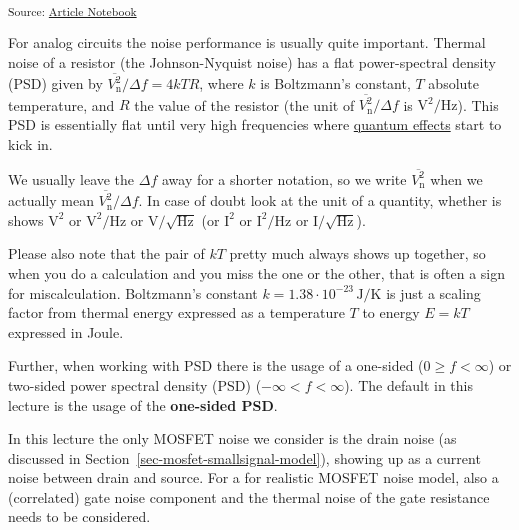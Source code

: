 \documentclass[
  a4paper,
  DIV=11,
  numbers=noendperiod]{scrartcl}
\begin{document}
\textsubscript{Source:
\href{https://iic-jku.github.io/analog-circuit-design/index.qmd.html}{Article
Notebook}}

For analog circuits the noise performance is usually quite important.
Thermal noise of a resistor (the Johnson-Nyquist noise) has a flat
power-spectral density (PSD) given by
\(\overline{V_\mathrm{n}^2}/\Delta f = 4 k T R\), where \(k\) is
Boltzmann's constant, \(T\) absolute temperature, and \(R\) the value of
the resistor (the unit of \(\overline{V_\mathrm{n}^2}/\Delta f\) is
\(\text{V}^2/\text{Hz}\)). This PSD is essentially flat until very high
frequencies where
\href{https://en.wikipedia.org/wiki/Johnson–Nyquist_noise}{quantum
effects} start to kick in.

\begin{tcolorbox}[enhanced jigsaw, breakable, title=\textcolor{quarto-callout-note-color}{\faInfo}\hspace{0.5em}{Noise Notation}, left=2mm, bottomrule=.15mm, opacitybacktitle=0.6, opacityback=0, colframe=quarto-callout-note-color-frame, leftrule=.75mm, bottomtitle=1mm, colbacktitle=quarto-callout-note-color!10!white, toprule=.15mm, rightrule=.15mm, toptitle=1mm, titlerule=0mm, arc=.35mm, colback=white, coltitle=black]

We usually leave the \(\Delta f\) away for a shorter notation, so we
write \(\overline{V_\mathrm{n}^2}\) when we actually mean
\(\overline{V_\mathrm{n}^2}/\Delta f\). In case of doubt look at the
unit of a quantity, whether is shows \(\text{V}^2\) or
\(\text{V}^2/\text{Hz}\) or \(\text{V}/\sqrt{\text{Hz}}\) (or
\(\text{I}^2\) or \(\text{I}^2/\text{Hz}\) or
\(\text{I}/\sqrt{\text{Hz}}\)).

Please also note that the pair of \(k T\) pretty much always shows up
together, so when you do a calculation and you miss the one or the
other, that is often a sign for miscalculation. Boltzmann's constant
\(k = 1.38 \cdot 10^{-23}\,\text{J/K}\) is just a scaling factor from
thermal energy expressed as a temperature \(T\) to energy \(E = k T\)
expressed in Joule.

Further, when working with PSD there is the usage of a one-sided
(\(0 \ge f < \infty\)) or two-sided power spectral density (PSD)
(\(-\infty < f < \infty\)). The default in this lecture is the usage of
the \textbf{one-sided PSD}.

\end{tcolorbox}

In this lecture the only MOSFET noise we consider is the drain noise (as
discussed in Section~\ref{sec-mosfet-smallsignal-model}), showing up as
a current noise between drain and source. For a for realistic MOSFET
noise model, also a (correlated) gate noise component and the thermal
noise of the gate resistance needs to be considered.
\end{document}
